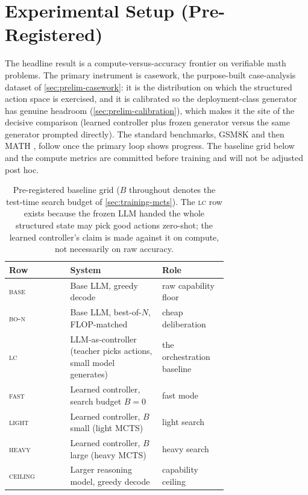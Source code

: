 \section{Experimental Setup (Pre-Registered)}
\label{sec:experimental-setup}

The headline result is a compute-versus-accuracy frontier on verifiable
math problems. The primary instrument is casework, the purpose-built
case-analysis dataset of \cref{sec:prelim-casework}: it is the
distribution on which the structured action space is exercised, and it is
calibrated so the deployment-class generator has genuine headroom
(\cref{sec:prelim-calibration}), which makes it the site of the decisive
comparison (learned controller plus frozen generator versus the same
generator prompted directly). The standard benchmarks, GSM8K \citep{gsm8k}
and then MATH \citep{math}, follow once the primary loop shows progress.
The baseline grid below and the compute metrics are committed before
training and will not be adjusted post hoc.

\begin{table}[h]
\centering
\footnotesize
\begin{tabular}{@{}lp{0.42\linewidth}p{0.30\linewidth}@{}}
\toprule
Row & System & Role \\
\midrule
\textsc{base} & Base LLM, greedy decode & raw capability floor \\
\textsc{bo-n} & Base LLM, best-of-$N$, FLOP-matched & cheap deliberation \\
\textsc{lc} & LLM-as-controller (teacher picks actions, small model generates) & the orchestration baseline \\
\textsc{fast} & Learned controller, search budget $B{=}0$ & fast mode \\
\textsc{light} & Learned controller, $B$ small (light MCTS) & light search \\
\textsc{heavy} & Learned controller, $B$ large (heavy MCTS) & heavy search \\
\textsc{ceiling} & Larger reasoning model, greedy decode & capability ceiling \\
\bottomrule
\end{tabular}
\caption{Pre-registered baseline grid ($B$ throughout denotes the
test-time search budget of \cref{sec:training-mcts}). The \textsc{lc} row
exists because the frozen LLM handed the whole structured state may pick
good actions zero-shot; the learned controller's claim is made against it
on compute, not necessarily on raw accuracy.}
\label{tab:grid}
\end{table}

